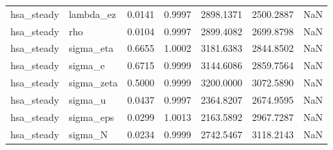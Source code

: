 \begin{tabular}{llrrrrl}
hsa\_steady & lambda\_ez & 0.0141 & 0.9997 & 2898.1371 & 2500.2887 & NaN \\
hsa\_steady & rho & 0.0104 & 0.9997 & 2899.4082 & 2699.8798 & NaN \\
hsa\_steady & sigma\_eta & 0.6655 & 1.0002 & 3181.6383 & 2844.8502 & NaN \\
hsa\_steady & sigma\_e & 0.6715 & 0.9999 & 3144.6086 & 2859.7564 & NaN \\
hsa\_steady & sigma\_zeta & 0.5000 & 0.9999 & 3200.0000 & 3072.5890 & NaN \\
hsa\_steady & sigma\_u & 0.0437 & 0.9997 & 2364.8207 & 2674.9595 & NaN \\
hsa\_steady & sigma\_eps & 0.0299 & 1.0013 & 2163.5892 & 2967.7287 & NaN \\
hsa\_steady & sigma\_N & 0.0234 & 0.9999 & 2742.5467 & 3118.2143 & NaN \\
\bottomrule
\end{tabular}
